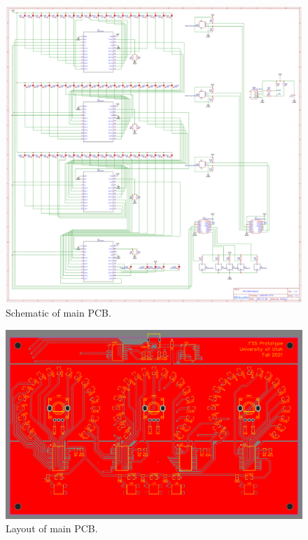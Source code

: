 \documentclass[conference]{IEEEtran}
\begin{document}
\begin{figure}[bhtp]
    \centering
    \includegraphics[width=6in]{./resources/figures/main_schematic.pdf}
    \caption{Schematic of main PCB.}
    \label{fig:main_schematic}
\end{figure}

\begin{figure}[bhtp]
    \centering
    \includegraphics[width=5.5in]{./resources/figures/main_pcb.pdf}
    \caption{Layout of main PCB.}
    \label{fig:main_pcb}
\end{figure}
\end{document}
